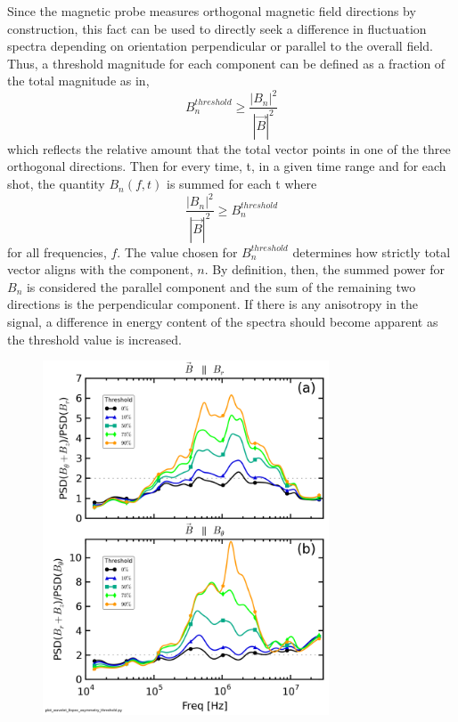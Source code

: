 \documentclass[aip,prl,amsmath,amssymb,reprint,superscriptaddress]{revtex4-1} %
\begin{document}
Since the magnetic probe measures orthogonal magnetic field directions by construction, this fact can be used to directly seek a difference in fluctuation spectra depending on orientation perpendicular or parallel to the overall field. Thus, a threshold magnitude for each component can be defined as a fraction of the total magnitude as in,
\begin{equation}
B_{n}^{threshold} \geq \frac{|B_{n}|^{2}}{|\vec{B}|^{2}}
\label{eq:Bthreshold}
\end{equation}
which reflects the relative amount that the total vector points in one of the three orthogonal directions. Then for every time, t, in a given time range and for each shot, the quantity $B_{n}(f,t)$ is summed for each t where
\begin{equation}
\frac{|B_{n}|^{2}}{|\vec{B}|^{2}} \geq B_{n}^{threshold}
\label{eq:Bcondition}
\end{equation}
for all frequencies, $f$. The value chosen for $B_{n}^{threshold}$ determines how strictly total vector aligns with the component, $n$. By definition, then, the summed power for $B_{n}$ is considered the parallel component and the sum of the remaining two directions is the perpendicular component. If there is any anisotropy in the signal, a difference in energy content of the spectra should become apparent as the threshold value is increased.

\begin{figure}[!htbp]
\centerline{
\includegraphics[width=8.5cm]{Bperppara_spectra_thresholdscan40t60us}}
\caption{\label{fig:thresholdmethod}}
\end{figure}
\end{document}

